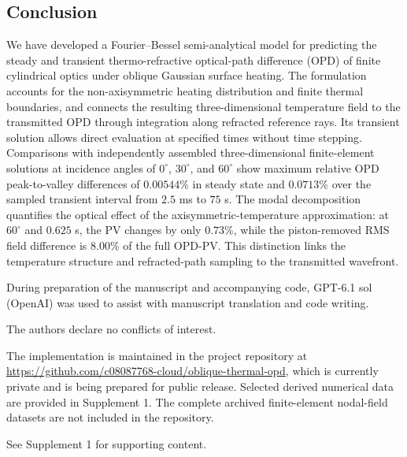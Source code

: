 \documentclass{optica-article}
\begin{document}
\begin{samepage}
\section{Conclusion}
We have developed a Fourier--Bessel semi-analytical model for predicting the steady and transient thermo-refractive optical-path difference (OPD) of finite cylindrical optics under oblique Gaussian surface heating.
The formulation accounts for the non-axisymmetric heating distribution and finite thermal boundaries, and connects the resulting three-dimensional temperature field to the transmitted OPD through integration along refracted reference rays.
Its transient solution allows direct evaluation at specified times without time stepping.
Comparisons with independently assembled three-dimensional finite-element solutions at incidence angles of $0^\circ$, $30^\circ$, and $60^\circ$ show maximum relative OPD peak-to-valley differences of $0.00544\%$ in steady state and $0.0713\%$ over the sampled transient interval from $2.5$ ms to $75$ s.
The modal decomposition quantifies the optical effect of the axisymmetric-temperature approximation: at $60^\circ$ and $0.625$ s, the PV changes by only $0.73\%$, while the piston-removed RMS field difference is $8.00\%$ of the full OPD-PV.
This distinction links the temperature structure and refracted-path sampling to the transmitted wavefront.

\end{samepage}
\par
\FloatBarrier
\begin{backmatter}
During preparation of the manuscript and accompanying code, GPT-6.1 sol (OpenAI) was used to assist with manuscript translation and code writing.

The authors declare no conflicts of interest.

The implementation is maintained in the project repository at \url{https://github.com/c08087768-cloud/oblique-thermal-opd}, which is currently private and is being prepared for public release.
Selected derived numerical data are provided in Supplement 1.
The complete archived finite-element nodal-field datasets are not included in the repository.

See Supplement 1 for supporting content.
\end{backmatter}


\end{document}
